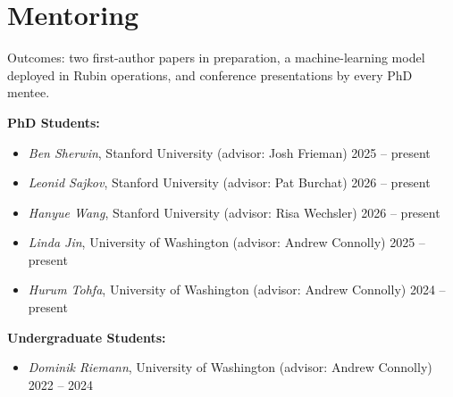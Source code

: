 \section{Mentoring}

Outcomes: two first-author papers in preparation, a machine-learning model deployed in Rubin operations, and conference presentations by every PhD mentee.

\textbf{PhD Students:}
\begin{itemize}
    \item \textit{Ben Sherwin}, Stanford University (advisor: Josh Frieman) \hfill 2025 -- present

    \item \textit{Leonid Sajkov}, Stanford University (advisor: Pat Burchat) \hfill 2026 -- present

    \item \textit{Hanyue Wang}, Stanford University (advisor: Risa Wechsler) \hfill 2026 -- present


    \item \textit{Linda Jin}, University of Washington (advisor: Andrew Connolly) \hfill 2025 -- present

    \item \textit{Hurum Tohfa}, University of Washington (advisor: Andrew Connolly) \hfill 2024 -- present
\end{itemize}

\textbf{Undergraduate Students:}
\begin{itemize}
    \item \textit{Dominik Riemann}, University of Washington (advisor: Andrew Connolly) \hfill 2022 -- 2024
\end{itemize}
